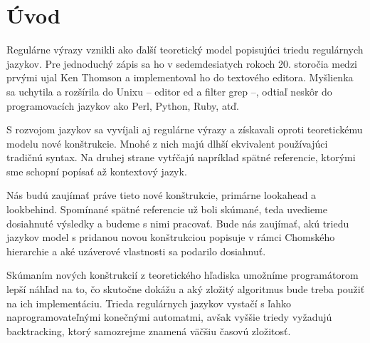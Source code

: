 {}
{}
\chapter*{Úvod}\label{chap:intro}

Regulárne výrazy vznikli ako ďalší teoretický model popisujúci triedu regulárnych jazykov. Pre jednoduchý zápis sa ho v sedemdesiatych rokoch 20. storočia medzi prvými ujal Ken Thomson a implementoval ho do textového editora. Myšlienka sa uchytila a rozšírila do Unixu -- editor ed a filter grep --, odtiaľ neskôr do programovacích jazykov ako Perl, Python, Ruby, atď. \cite{Cox07SlowPython}

S rozvojom jazykov sa vyvíjali aj regulárne výrazy a získavali oproti teoretickému modelu nové konštrukcie. Mnohé z nich majú dlhší ekvivalent používajúci tradičnú syntax. Na druhej strane vytŕčajú napríklad spätné referencie, ktorými sme schopní popísať až kontextový jazyk.

Nás budú zaujímať práve tieto nové konštrukcie, primárne lookahead a lookbehind. Spomínané spätné referencie už boli skúmané, teda uvedieme dosiahnuté výsledky a budeme s nimi pracovať. Bude nás zaujímať, akú triedu jazykov model s pridanou novou konštrukciou popisuje v rámci Chomského hierarchie a aké uzáverové vlastnosti sa podarilo dosiahnuť.

Skúmaním nových konštrukcií z teoretického hľadiska umožníme programátorom lepší náhľad na to, čo skutočne dokážu a aký zložitý algoritmus bude treba použiť na ich implementáciu. Trieda regulárnych jazykov vystačí s ľahko naprogramovateľnými konečnými automatmi, avšak vyššie triedy vyžadujú backtracking, ktorý samozrejme znamená väčšiu časovú zložitosť.
